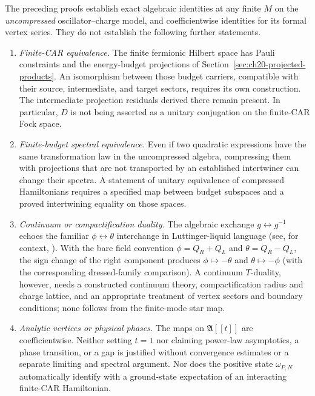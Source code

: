 The preceding proofs establish exact algebraic identities at any
finite $M$ on the \emph{uncompressed} oscillator--charge model,
and coefficientwise identities for its formal vertex series.  They
do not establish the following further statements.

\begin{enumerate}
\item \emph{Finite-CAR equivalence.}  The finite fermionic Hilbert
space has Pauli constraints and the energy-budget projections of
Section~\ref{sec:ch20-projected-products}.  An isomorphism between
those budget carriers, compatible with their source, intermediate,
and target sectors, requires its own construction.  The intermediate
projection residuals derived there remain present.  In particular,
$D$ is not being asserted as a unitary conjugation on the finite-CAR
Fock space.

\item \emph{Finite-budget spectral equivalence.}  Even if two
quadratic expressions have the same transformation law in the
uncompressed algebra, compressing them with projections that are not
transported by an established intertwiner can change their
spectra.  A statement of unitary equivalence of compressed
Hamiltonians requires a specified map between budget subspaces and
a proved intertwining equality on those spaces.

\item \emph{Continuum or compactification duality.}  The algebraic
exchange $g\leftrightarrow g^{-1}$ echoes the familiar
$\phi\leftrightarrow\theta$ interchange in Luttinger-liquid
language (see, for context, \cite{giamarchi2004}).  With the bare
field convention $\phi=Q_R+Q_L$ and
$\theta=Q_R-Q_L$, the sign change of the right component produces
$\phi\mapsto-\theta$ and $\theta\mapsto-\phi$ (with the corresponding
dressed-family comparison).  A continuum $T$-duality, however,
needs a constructed continuum theory, compactification radius and
charge lattice, and an appropriate treatment of vertex sectors and
boundary conditions; none follows from the finite-mode star map.

\item \emph{Analytic vertices or physical phases.}  The maps on
$\mathfrak A[[t]]$ are coefficientwise.  Neither setting $t=1$ nor
claiming power-law asymptotics, a phase transition, or a gap is
justified without convergence estimates or a separate limiting and
spectral argument.  Nor does the positive state
$\omega_{P,N}$ automatically identify with a ground-state
expectation of an interacting finite-CAR Hamiltonian.
\end{enumerate}

